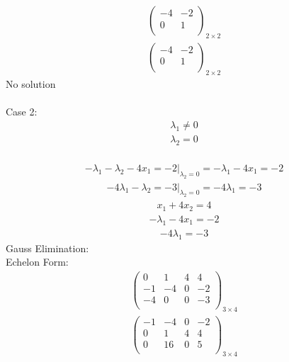 \documentclass{article}
\begin{document}
\begin{align*}
\left(
\begin{array}{c|c}
-4 & -2\\
0 & 1\\
\end{array}
\right)_{2\times 2}
\end{align*}
\begin{align*}
\left(
\begin{array}{c|c}
-4 & -2\\
0 & 1\\
\end{array}
\right)_{2\times 2}
\end{align*}
No solution\\
\\
Case 2: \begin{align*}
\lambda_{1}\ne0\end{align*}
 \begin{align*}
\lambda_{2}=0\end{align*}
 \\
\begin{align*}
\left.-\lambda_{1} - \lambda_{2} - 4x_{1}=-2\right|_{\lambda_{2}=0}=-\lambda_{1} - 4x_{1}=-2\end{align*}
\begin{align*}
\left.-4\lambda_{1} - \lambda_{2}=-3\right|_{\lambda_{2}=0}=-4\lambda_{1}=-3\end{align*}
\begin{align*}
x_{1} + 4x_{2}=4\end{align*}
\begin{align*}
-\lambda_{1} - 4x_{1}=-2\end{align*}
\begin{align*}
-4\lambda_{1}=-3\end{align*}
Gauss Elimination:\\
Echelon Form:\\
\begin{align*}
\left(
\begin{array}{ccc|c}
0 & 1 & 4 & 4\\
-1 & -4 & 0 & -2\\
-4 & 0 & 0 & -3\\
\end{array}
\right)_{3\times 4}
\end{align*}
\begin{align*}
\left(
\begin{array}{ccc|c}
-1 & -4 & 0 & -2\\
0 & 1 & 4 & 4\\
0 & 16 & 0 & 5\\
\end{array}
\right)_{3\times 4}
\end{align*}
\end{document}
